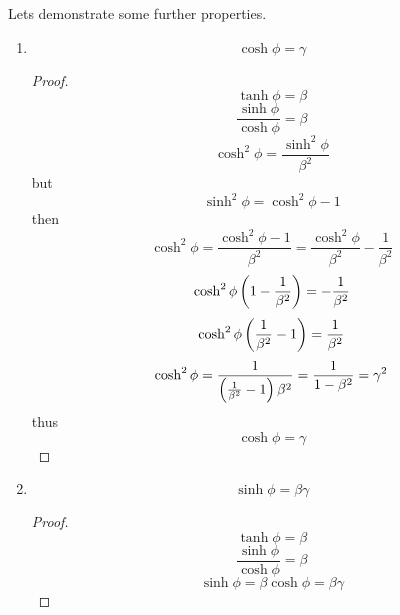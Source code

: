 \documentclass[oneside, 10pt, notitlepage]{book}
\begin{document}
Lets demonstrate some further properties.

\begin{enumerate}
    \item \begin{equation}\cosh \phi = \gamma\end{equation}
        \begin{proof}
        	\begin{equation}\tanh \phi = \beta\end{equation}
            \begin{equation}\frac{\sinh \phi}{\cosh \phi} = \beta\end{equation}
            \begin{equation}\cosh^2 \phi = \frac{\sinh^2 \phi}{\beta^2}\end{equation}
            but
            \begin{equation}\sinh^2 \phi = \cosh^2 \phi -1\end{equation}
            then
            \begin{equation}\cosh^2 \phi = \frac{\cosh^2 \phi -1}{\beta^2} = \frac{\cosh^2 \phi}{\beta^2} - \frac{1}{\beta^2}\end{equation}
        	\begin{equation} \cosh^2 \phi \left(1 - \frac{1}{\beta^2}\right) = - \frac{1}{\beta^2} \end{equation}
        	\begin{equation}\cosh^2 \phi \left(\frac{1}{\beta^2} - 1\right) = \frac{1}{\beta^2}\end{equation}
        	\begin{equation}\cosh^2 \phi  = \frac{1}{\left(\frac{1}{\beta^2} - 1\right)\beta^2} = \frac{1}{1-\beta^2} = \gamma^2\end{equation}
        	thus
        	\begin{equation}\cosh \phi = \gamma\end{equation}
        \end{proof}
        
    \item \begin{equation}\sinh \phi = \beta \gamma\end{equation}
        \begin{proof}
        	\begin{equation}\tanh \phi = \beta\end{equation}
            \begin{equation}\frac{\sinh \phi}{\cosh \phi} = \beta\end{equation}
            \begin{equation}\sinh \phi = \beta \cosh \phi = \beta \gamma\end{equation}
        \end{proof}
 

\end{enumerate}
\end{document}
